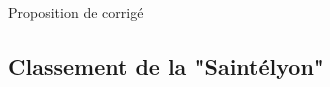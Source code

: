 
\vspace{0.1cm}
\begin{huge}
 Proposition de corrigé
\end{huge}

\subsection{Classement de la "Saintélyon"}
\setcounter{thequestion}{0}
\subsection{}
\setcounter{thequestion}{0}
